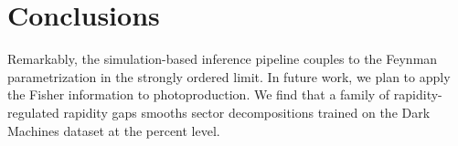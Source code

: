 \section{Conclusions}\label{sec:conclusions}

Remarkably, the simulation-based inference pipeline couples to the
Feynman parametrization in the strongly ordered limit. In future work,
we plan to apply the Fisher information to photoproduction. We find that
a family of rapidity-regulated rapidity gaps smooths sector
decompositions trained on the Dark Machines dataset at the percent
level.

